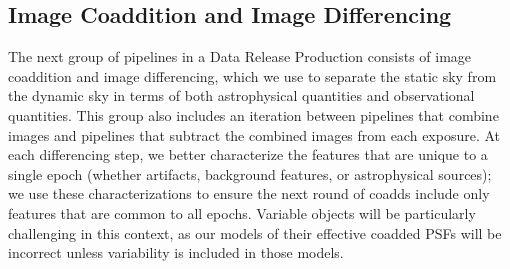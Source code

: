 \subsection{Image Coaddition and Image Differencing}
\label{sec:drp_coaddition_and_diffim}

The next group of pipelines in a Data Release Production consists of image coaddition and image differencing, which we use to separate the static sky from the dynamic sky in terms of both astrophysical quantities and observational quantities.  This group also includes an iteration between pipelines that combine images and pipelines that subtract the combined images from each exposure.  At each differencing step, we better characterize the features that are unique to a single epoch (whether artifacts, background features, or astrophysical sources); we use these characterizations to ensure the next round of coadds include only features that are common to all epochs.  Variable objects will be particularly challenging in this context, as our models of their effective coadded PSFs will be incorrect unless variability is included in those models.


